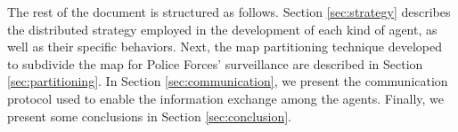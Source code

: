 The rest of the document is structured as follows. Section \ref{sec:strategy} describes the distributed strategy employed in the development of each kind of agent, as well as their specific behaviors. Next, the map partitioning technique developed to subdivide the map for Police Forces' surveillance are described in Section \ref{sec:partitioning}. In Section \ref{sec:communication}, we present the communication protocol used to enable the information exchange among the agents. Finally, we present some conclusions in Section \ref{sec:conclusion}.
